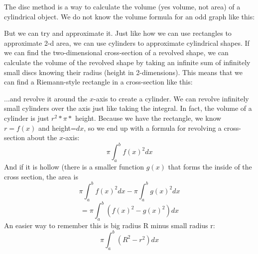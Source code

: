 \documentclass[../revisedmain.tex]{subfiles}
\begin{document}
The disc method is a way to calculate the volume (yes volume, not area) of a cylindrical object. We do not know the volume formula for an odd graph like this:
\begin{center}
\end{center}
But we can try and approximate it. Just like how we can use rectangles to approximate 2-d area, we can use cylinders to approximate cylindrical shapes. If we can find the two-dimensional cross-section of a revolved shape, we can calculate the volume of the revolved shape by taking an infinite sum of infinitely small discs knowing their radius (height in 2-dimensions). This means that we can find a Riemann-style rectangle in a cross-section like this:
\begin{center}
\end{center}
...and revolve it around the $x$-axis to create a cylinder. We can revolve infinitely small cylinders over the axis just like taking the integral. In fact, the volume of a cylinder is just $r^2 * \pi *$ height. Because we have the rectangle, we know $r=f(x)$ and height=$dx$, so we end up with a formula for revolving a cross-section about the $x$-axis:$$\pi\int_{a}^{b}f(x)^2dx$$ And if it is hollow (there is a smaller function $g(x)$ that forms the inside of the cross section, the area is $$\pi\int_{a}^{b}f(x)^2dx-\pi\int_{a}^{b}g(x)^2dx$$$$=\pi\int_{a}^{b}\left(f(x)^2-g(x)^2\right)dx$$ An easier way to remember this is big radius R minus small radius r:$$\pi\int_{a}^{b}\left(R^2-r^2\right)dx$$
\end{document}
